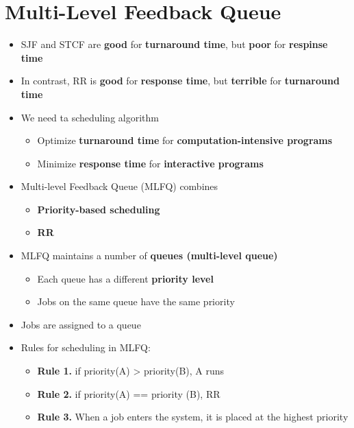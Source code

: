 \documentclass[a4paper,11pt,english]{article}
\begin{document}
\section*{Multi-Level Feedback Queue}
\begin{itemize}
    \item SJF and STCF are \textbf{\color{blue} good} for \textbf{\color{blue} turnaround time}, but \textbf{\color{red} poor} for \textbf{\color{red} respinse time}
    \item In contrast, RR is \textbf{\color{blue} good} for \textbf{\color{blue} response time}, but \textbf{\color{red} terrible} for \textbf{\color{red} turnaround time}
    \item We need ta scheduling algorithm
        \begin{itemize}
            \item Optimize \textbf{\color{blue} turnaround time} for \textbf{\color{blue} computation-intensive programs}
            \item Minimize \textbf{\color{blue} response time} for \textbf{\color{blue} interactive programs}
        \end{itemize}
    \item Multi-level Feedback Queue (MLFQ) combines
        \begin{itemize}
            \item \textbf{\color{blue} Priority-based scheduling}
            \item \textbf{\color{blue} RR}
        \end{itemize}
    \item MLFQ maintains a number of \textbf{\color{blue} queues (multi-level queue)}
        \begin{itemize}
            \item Each queue has a different \textbf{\color{blue} priority level}
            \item Jobs on the same queue have the same priority
        \end{itemize}
    \item Jobs are assigned to a queue
    \item Rules for scheduling in MLFQ:
        \begin{itemize}
            \item \textbf{\color{blue} Rule 1.} if priority(A) > priority(B), A runs
            \item \textbf{\color{blue} Rule 2.} if priority(A) == priority (B), RR
            \item \textbf{\color{blue} Rule 3.} When a job enters the system, it is placed at the highest priority

\end{itemize}
\end{itemize}
\end{document}

